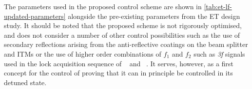 The parameters used in the proposed control scheme are shown in \cref{tab:et-lf-updated-parameters} alongside the pre-existing parameters from the \gls{ET} design study. It should be noted that the proposed scheme is not rigorously optimised, and does not consider a number of other control possibilities such as the use of secondary reflections arising from the anti-reflective coatings on the beam splitter and \glspl{ITM} or the use of higher order combinations of $f_1$ and $f_2$ such as \emph{3f} signals used in the lock acquisition sequence of \VIRGO{}~\cite{Acernese2008} and \ALIGO{}~\cite{Staley2014}. It serves, however, as a first concept for the control of \ETLF{} proving that it can in principle be controlled in its detuned state.

\begin{table}
  \centering
\end{table}
